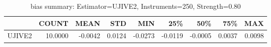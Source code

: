 \begin{table}[ht]
\centering
\caption{bias summary: Estimator=UJIVE2, Instruments=250, Strength=0.80}
\begin{tabular}{lrrrrrrrr}
\toprule
 & COUNT & MEAN & STD & MIN & 25\% & 50\% & 75\% & MAX \\
\midrule
UJIVE2 & 10.0000 & -0.0042 & 0.0124 & -0.0273 & -0.0119 & -0.0005 & 0.0037 & 0.0098 \\
\bottomrule
\end{tabular}
\end{table}
